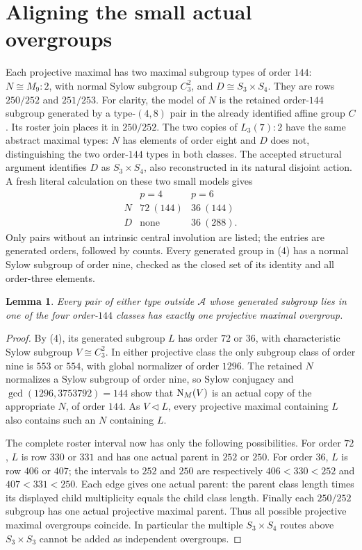 \documentclass[11pt,a4paper]{article}
\newtheorem{lemma}{Lemma}
\begin{document}
\section*{Aligning the small actual overgroups}
Each projective maximal has two maximal subgroup types of order $144$:
$N\cong M_9:2$, with normal Sylow subgroup $C_3^2$, and
$D\cong S_3\times S_4$. They are rows $250/252$ and $251/253$.
For clarity, the model of $N$ is the retained order-$144$ subgroup
generated by a type-$(4,8)$ pair in the already identified affine
group $C$. Its roster join places it in $250/252$. The two copies
of $L_3(7):2$ have the same abstract maximal types: $N$ has elements
of order eight and $D$ does not, distinguishing the two order-$144$
types in both classes. The accepted structural argument identifies
$D$ as $S_3\times S_4$, also reconstructed in its natural disjoint
action. A fresh literal calculation on these two small models gives
\[
\begin{array}{c|cc}
&p=4&p=6\\\hline
N&72\ (144)&36\ (144)\\
D&\text{none}&36\ (288).
\end{array}                                                \tag{4}
\]
Only pairs without an intrinsic central involution are listed;
the entries are generated orders, followed by counts. Every generated
group in (4) has a normal Sylow subgroup of order nine, checked as
the closed set of its identity and all order-three elements.

\begin{lemma}\label{small}
Every pair of either type outside $\mathcal A$ whose generated
subgroup lies in one of the four order-$144$ classes has exactly
one projective maximal overgroup.
\end{lemma}
\begin{proof}
By (4), its generated subgroup $L$ has order $72$ or $36$, with
characteristic Sylow subgroup $V\cong C_3^2$. In either projective
class the only subgroup class of order nine is $553$ or $554$,
with global normalizer of order $1296$. The retained $N$ normalizes
a Sylow subgroup of order nine, so Sylow conjugacy and
$\gcd(1296,3753792)=144$ show that $\mathrm N_M(V)$ is an actual copy
of the appropriate $N$, of order $144$. As $V\lhd L$, every
projective maximal containing $L$ also contains such an $N$
containing $L$.

The complete roster interval now has only the following possibilities.
For order $72$, $L$ is row $330$ or $331$ and has one actual parent
in $252$ or $250$. For order $36$, $L$ is row $406$ or $407$;
the intervals to $252$ and $250$ are respectively
$406<330<252$ and $407<331<250$. Each edge gives one actual parent:
the parent class length times its displayed child multiplicity
equals the child class length. Finally each $250/252$ subgroup
has one actual projective maximal parent. Thus all possible
projective maximal overgroups coincide. In particular the multiple
$S_3\times S_4$ routes above $S_3\times S_3$ cannot be added as
independent overgroups.
\end{proof}
\end{document}
